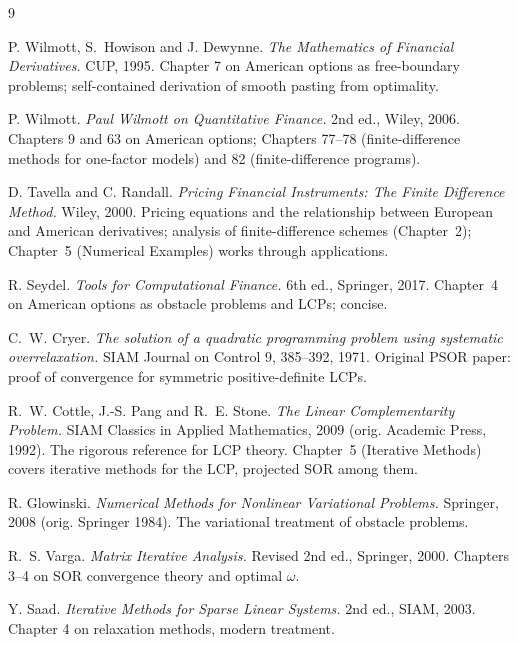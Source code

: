 \documentclass[11pt,a4paper]{article}
\begin{document}
\begin{thebibliography}{9}

P. Wilmott, S.~Howison and J. Dewynne.
\emph{The Mathematics of Financial Derivatives.}
CUP, 1995. Chapter 7 on American options as free-boundary problems;
self-contained derivation of smooth pasting from optimality.

P. Wilmott.
\emph{Paul Wilmott on Quantitative Finance.}
2nd ed., Wiley, 2006. Chapters 9 and 63 on American options;
Chapters 77--78 (finite-difference methods for one-factor models) and
82 (finite-difference programs).

D. Tavella and C. Randall.
\emph{Pricing Financial Instruments: The Finite Difference Method.}
Wiley, 2000. Pricing equations and the relationship between European
and American derivatives; analysis of finite-difference schemes
(Chapter~2); Chapter~5 (Numerical Examples) works through
applications.

R. Seydel.
\emph{Tools for Computational Finance.}
6th ed., Springer, 2017. Chapter~4 on American options as obstacle
problems and LCPs; concise.

C.~W. Cryer.
\emph{The solution of a quadratic programming problem using
systematic overrelaxation.}
SIAM Journal on Control 9, 385--392, 1971. Original PSOR paper:
proof of convergence for symmetric positive-definite LCPs.

R.~W. Cottle, J.-S. Pang and R.~E. Stone.
\emph{The Linear Complementarity Problem.}
SIAM Classics in Applied Mathematics, 2009 (orig. Academic Press,
1992). The rigorous reference for LCP theory. Chapter~5 (Iterative
Methods) covers iterative methods for the LCP, projected SOR among them.

R. Glowinski.
\emph{Numerical Methods for Nonlinear Variational Problems.}
Springer, 2008 (orig. Springer 1984). The variational treatment of
obstacle problems.

R.~S. Varga.
\emph{Matrix Iterative Analysis.}
Revised 2nd ed., Springer, 2000. Chapters 3--4 on SOR convergence
theory and optimal $\omega$.

Y. Saad.
\emph{Iterative Methods for Sparse Linear Systems.}
2nd ed., SIAM, 2003. Chapter 4 on relaxation methods, modern
treatment.

\end{thebibliography}
\end{document}
